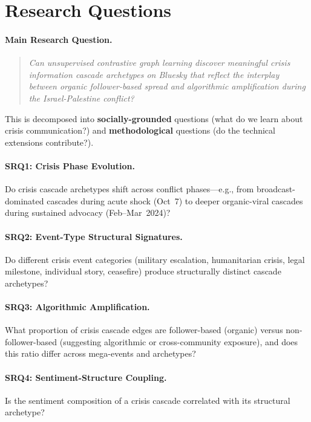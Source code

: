 \documentclass[12pt,a4paper]{article}
\begin{document}
\section{Research Questions}

\paragraph{Main Research Question.}
\begin{quote}
\emph{Can unsupervised contrastive graph learning discover meaningful crisis
information cascade archetypes on Bluesky that reflect the interplay between
organic follower-based spread and algorithmic amplification during the
Israel-Palestine conflict?}
\end{quote}

\noindent
This is decomposed into \textbf{socially-grounded} questions (what do we learn
about crisis communication?) and \textbf{methodological} questions (do the
technical extensions contribute?).

\paragraph{SRQ1: Crisis Phase Evolution.}
Do crisis cascade archetypes shift across conflict phases---e.g., from
broadcast-dominated cascades during acute shock (Oct~7) to deeper organic-viral
cascades during sustained advocacy (Feb--Mar~2024)?

\paragraph{SRQ2: Event-Type Structural Signatures.}
Do different crisis event categories (military escalation, humanitarian crisis,
legal milestone, individual story, ceasefire) produce structurally distinct
cascade archetypes?

\paragraph{SRQ3: Algorithmic Amplification.}
What proportion of crisis cascade edges are follower-based (organic) versus
non-follower-based (suggesting algorithmic or cross-community exposure), and does
this ratio differ across mega-events and archetypes?

\paragraph{SRQ4: Sentiment-Structure Coupling.}
Is the sentiment composition of a crisis cascade correlated with its structural
archetype?
\end{document}
